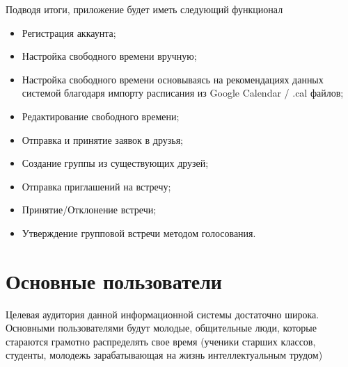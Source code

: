 \documentclass[14pt]{extreport}
\begin{document}
Подводя итоги, приложение будет иметь следующий функционал 
\begin{itemize}
    \item Регистрация аккаунта;
    \item Настройка свободного времени вручную;
    \item Настройка свободного времени основываясь на рекомендациях данных системой благодаря импорту расписания из Google Calendar / .cal файлов;
    \item Редактирование свободного времени;
    \item Отправка и принятие заявок в друзья;
    \item Создание группы из существующих друзей;
    \item Отправка приглашений на встречу;
    \item Принятие/Отклонение встречи;
    \item Утверждение групповой встречи методом голосования.
\end{itemize}
\section{Основные пользователи  }

Целевая аудитория данной информационной системы достаточно широка. Основными пользователями будут молодые, общительные люди, которые стараются грамотно распределять свое время (ученики старших классов, студенты, молодежь зарабатывающая на жизнь интеллектуальным трудом)

\newpage
\end{document}

